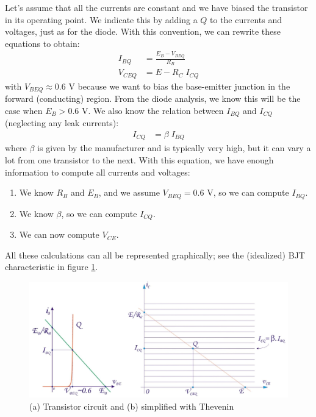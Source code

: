 Let's assume that all the currents are constant and we have biased the transistor in its operating point. We indicate this by adding a $Q$ to the currents and voltages, just as for the diode. With this convention, we can rewrite these equations to obtain:
\begin{equation}
	\begin{split}
		I_{BQ} &= \frac{E_B - V_{BEQ}}{R_B}\\
		V_{CEQ} &= E - R_C \; I_{CQ}
	\end{split}
\end{equation}
with $V_{BEQ} \approx 0.6$ V because we want to bias the base-emitter junction in the forward (conducting) region. From the diode analysis, we know this will be the case when $E_B > 0.6$ V. We also know the relation between $I_{BQ}$ and $I_{CQ}$ (neglecting any leak currents):
\begin{equation}
	\begin{split}
		I_{CQ} &= \beta \; I_{BQ}
	\end{split}
\end{equation}
where $\beta$ is given by the manufacturer and is typically very high, but it can vary a lot from one transistor to the next. With this equation, we have enough information to compute all currents and voltages:
\begin{enumerate}
	\item We know $R_B$ and $E_B$, and we assume $V_{BEQ} = 0.6$ V, so we can compute $I_{BQ}$.
	\item We know $\beta$, so we can compute $I_{CQ}$.
	\item We can now compute $V_{CE}$.
\end{enumerate}
All these calculations can all be represented graphically; see the (idealized) BJT characteristic in figure \ref{fig:bjt_load2}.
\begin{figure}[h!]
	\centering
	\includegraphics[width=12cm]{figures/ch02/bjt_load2.jpg}
	\caption{(a) Transistor circuit and (b) simplified with Thevenin} 
	\label{fig:bjt_load2}
\end{figure}
